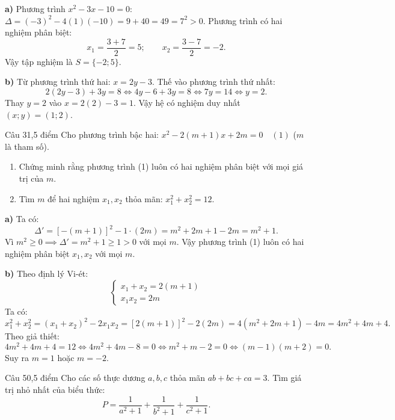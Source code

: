 \begin{loi_giai_cau}
\textbf{a)} Phương trình $x^2 - 3x - 10 = 0$:
$\Delta = (-3)^2 - 4(1)(-10) = 9 + 40 = 49 = 7^2 > 0$.
Phương trình có hai nghiệm phân biệt:
\[x_1 = \frac{3+7}{2} = 5;\qquad x_2 = \frac{3-7}{2} = -2.\]
Vậy tập nghiệm là $\boxed{S = \{-2; 5\}}$.

\textbf{b)} Từ phương trình thứ hai: $x = 2y - 3$. Thế vào phương trình thứ nhất:
\[2(2y - 3) + 3y = 8 \iff 4y - 6 + 3y = 8 \iff 7y = 14 \iff y = 2.\]
Thay $y = 2$ vào $x = 2(2) - 3 = 1$.
Vậy hệ có nghiệm duy nhất $\boxed{(x; y) = (1; 2)}$.
\end{loi_giai_cau}

\begin{de_cau}{Câu 3}{1,5 điểm}
Cho phương trình bậc hai: $x^2 - 2(m+1)x + 2m = 0 \quad (1)$ ($m$ là tham số).
\begin{enumerate}[label=\alph*)]
\item Chứng minh rằng phương trình (1) luôn có hai nghiệm phân biệt với mọi giá trị của $m$.
\item Tìm $m$ để hai nghiệm $x_1, x_2$ thỏa mãn: $x_1^2 + x_2^2 = 12$.
\end{enumerate}
\end{de_cau}

\begin{loi_giai_cau}
\textbf{a)} Ta có:
\[\Delta' = [-(m+1)]^2 - 1 \cdot (2m) = m^2 + 2m + 1 - 2m = m^2 + 1.\]
Vì $m^2 \ge 0 \implies \Delta' = m^2 + 1 \ge 1 > 0$ với mọi $m$.
Vậy phương trình (1) luôn có hai nghiệm phân biệt $x_1, x_2$ với mọi $m$.

\textbf{b)} Theo định lý Vi-ét:
\[\begin{cases} x_1 + x_2 = 2(m+1) \\ x_1 x_2 = 2m \end{cases}\]
Ta có:
\[x_1^2 + x_2^2 = (x_1+x_2)^2 - 2x_1 x_2 = [2(m+1)]^2 - 2(2m) = 4(m^2+2m+1) - 4m = 4m^2 + 4m + 4.\]
Theo giả thiết:
\[4m^2 + 4m + 4 = 12 \iff 4m^2 + 4m - 8 = 0 \iff m^2 + m - 2 = 0 \iff (m-1)(m+2) = 0.\]
Suy ra $\boxed{m = 1}$ hoặc $\boxed{m = -2}$.
\end{loi_giai_cau}

\begin{de_cau}{Câu 5}{0,5 điểm}
Cho các số thực dương $a, b, c$ thỏa mãn $ab + bc + ca = 3$. Tìm giá trị nhỏ nhất của biểu thức:
\[P = \dfrac{1}{a^2+1} + \dfrac{1}{b^2+1} + \dfrac{1}{c^2+1}.\]
\end{de_cau}

